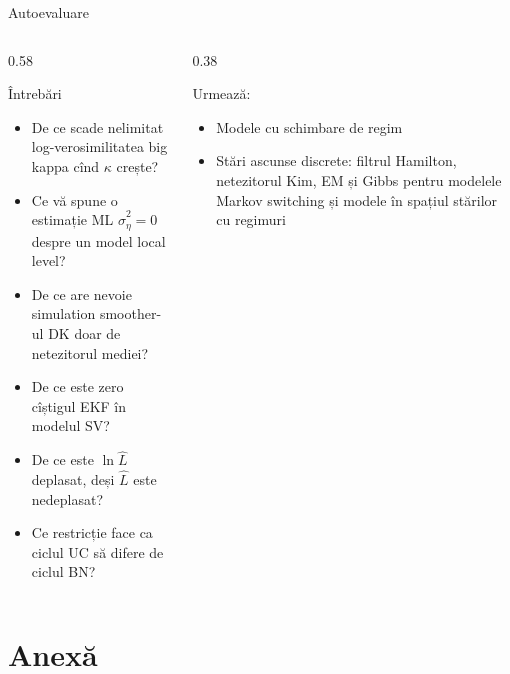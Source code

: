 \begin{frame}{Autoevaluare}
\itemsize{\small}
\begin{columns}[T]
\begin{column}{0.58\textwidth}
\begin{block}{Întrebări}
\begin{itemize}
    \item De ce scade nelimitat log-verosimilitatea big kappa cînd $\kappa$ crește?
    \item Ce vă spune o estimație ML $\hat\sigma^2_\eta = 0$ despre un model local level?
    \item De ce are nevoie simulation smoother-ul DK doar de netezitorul mediei?
    \item De ce este zero cîștigul EKF în modelul SV?
    \item De ce este $\ln\hat L$ deplasat, deși $\hat L$ este nedeplasat?
    \item Ce restricție face ca ciclul UC să difere de ciclul BN?
\end{itemize}
\end{block}
\end{column}
\begin{column}{0.38\textwidth}
\begin{block}{Urmează: }
\begin{itemize}
    \item Modele cu schimbare de regim
    \item Stări ascunse discrete: filtrul Hamilton, netezitorul Kim, EM și Gibbs pentru modelele Markov switching și modele în spațiul stărilor cu regimuri
\end{itemize}
\end{block}
\end{column}
\end{columns}
\end{frame}


\section{Anexă}

